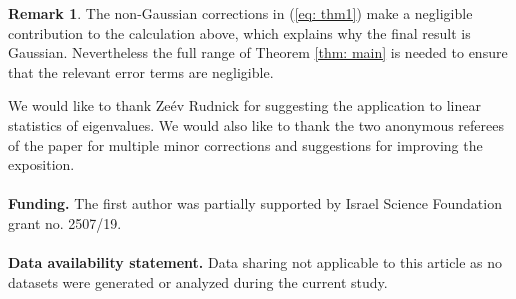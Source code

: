\documentclass[alphabetic, 
        colorlinks,
        linkcolor=red,  citecolor=blue,
        backref
]{amsart}
\numberwithin{equation}{section}
\theoremstyle{definition}
\newtheorem{rem}[claim]{Remark}
\begin{document}
\begin{rem} The non-Gaussian corrections in (\ref{eq: thm1}) make a negligible contribution to the calculation above, which explains why the final result is Gaussian. Nevertheless the full range of Theorem \ref{thm: main} is needed to ensure that the relevant error terms are negligible.\end{rem}

 We would like to thank Ze\'ev Rudnick for suggesting the application to linear statistics of eigenvalues. We would also like to thank the two anonymous referees of the paper for multiple minor corrections and suggestions for improving the exposition.
\\ \\
{\bf Funding.} The first author was partially supported by Israel Science Foundation grant no. 2507/19.
\\ \\
{\bf Data availability statement.} Data sharing not applicable to this article as no datasets were generated or
analyzed during the current study.




\end{document}
